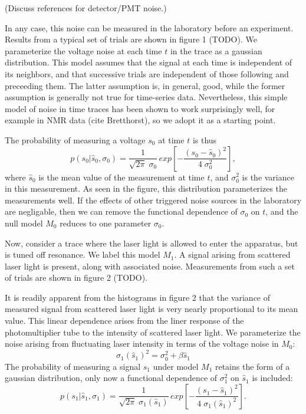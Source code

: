 \documentclass[12pt]{article}
\begin{document}
(Discuss references for detector/PMT noise.) 

In any case, this noise can be measured in the laboratory before an
experiment.  Results from a typical set of trials are shown in figure
1 (TODO).  We parameterize the voltage noise at each time $t$ in the
trace as a gaussian distribution.  This model assumes that the signal
at each time is independent of its neighbors, and that successive
trials are independent of those following and preceeding them.  The
latter assumption is, in general, good, while the former assumption is
generally not true for time-series data.  Nevertheless, this simple
model of noise in time traces has been shown to work surprisingly
well, for example in NMR data (cite Bretthorst), so we adopt it as a
starting point.

The probability of measuring a voltage $s_0$ at time $t$ is thus
\begin{equation}
  p(s_{0} \vert \hat{s}_{0}, \sigma_{0}) 
  = \frac{1}{\sqrt{2 \pi} \; \sigma_{0}} \,
  exp 
  \left[
    -\frac{(s_{0}-\hat{s}_{0})^2}{4 \; \sigma_{0}^2}
  \right] ,
\end{equation}
where $\hat{s}_{0}$ is the mean value of the measurement at time $t$,
and $\sigma^2_{0}$ is the variance in this measurement.  As seen in
the figure, this distribution parameterizes the measurements well.  If
the effects of other triggered noise sources in the laboratory are
negligable, then we can remove the functional dependence of $\sigma_0$
on $t$, and the null model $M_0$ reduces to one parameter $\sigma_0$.

Now, consider a trace where the laser light is allowed to enter the
apparatus, but is tuned off resonance.  We label this model $M_1$.  A
signal arising from scattered laser light is present, along with
associated noise. Measurements from such a set of trials are shown in
figure 2 (TODO).

It is readily apparent from the histograms in figure 2 that the
variance of measured signal from scattered laser light is very nearly
proportional to its mean value.  This linear dependence arises from
the liner response of the photomultiplier tube to the intensity of
scattered laser light.  We parameterize the noise arising from
fluctuating laser intensity in terms of the voltage noise in $M_0$:
\begin{equation}
  \sigma_1(\hat{s}_1)^2 = \sigma_0^2 + \beta \hat{s}_1
\end{equation}
The probability of measuring a signal $s_1$ under model $M_1$ retains
the form of a gaussian distribution, only now a functional dependence
of $\sigma_1^2$ on $\hat{s}_1$ is included:
\begin{equation}
  p(s_1 \vert \hat{s}_1, \sigma_1) 
  = \frac{1}{\sqrt{2 \pi} \; \sigma_1(\hat{s}_1)} \,
  exp 
  \left[
    -\frac{(s_1-\hat{s}_1)^2}{4 \; \sigma_1(\hat{s}_1)^2}
  \right] .
\end{equation}
\end{document}
